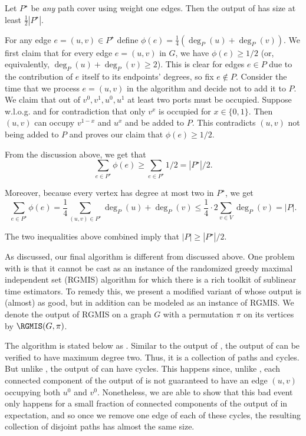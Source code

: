 \begin{claim}\label{clm: alg-one-approx}
    Let $P^\star$ be {\em any} path cover using weight one edges. Then the output of \algone{} has size at least $\frac{1}{2}|P^\star|$.
\end{claim}
\begin{myproof}
    For any edge $e=(u, v) \in P^\star$ define $\phi(e) = \frac{1}{4}(\deg_P(u) + \deg_P(v))$. We first claim that for every edge $e=(u, v)$ in $G$, we have $\phi(e) \geq 1/2$ (or, equivalently, $\deg_P(u)+\deg_P(v) \geq 2$). This is clear for edges $e \in P$ due to the contribution of $e$ itself to its endpoints' degrees, so fix $e \not\in P$. Consider the time that we process $e=(u, v)$ in the algorithm and decide not to add it to $P$. We claim that out of $v^0, v^1, u^0, u^1$ at least two ports must be occupied. Suppose w.l.o.g. and for contradiction that only $v^x$ is occupied for $x \in \{0, 1\}$. Then $(u, v)$ can occupy $v^{1-x}$ and $u^x$ and be added to $P$. This contradicts $(u, v)$ not being added to $P$ and proves our claim that $\phi(e) \geq 1/2$. 
    
    From the discussion above, we get that
    $$
        \sum_{e \in P^\star} \phi(e) \geq \sum_{e \in P^\star} 1/2 = |P^\star|/2.
    $$
    
    Moreover, because every vertex has degree at most two in $P^\star$, we get 
    $$
    \sum_{e \in P^\star} \phi(e) = \frac{1}{4} \sum_{(u, v) \in P^\star} \deg_P(u)+\deg_P(v) \leq \frac{1}{4} \cdot 2 \sum_{v \in V} \deg_P(v) = |P|.
    $$
    
    The two inequalities above combined imply that $|P| \geq |P^\star|/2$.
\end{myproof}

As discussed, our final algorithm is different from \algone{} discussed above. One problem with \algone{} is that it cannot be cast as an instance of the randomized greedy maximal independent set (RGMIS) algorithm for which there is a rich toolkit of sublinear time estimators. To remedy this, we present a modified variant of \algone{} whose output is (almost) as good, but in addition can be modeled as an instance of RGMIS. We denote the output of RGMIS on a graph $G$ with a permutation $\pi$ on its vertices by $\RGMIS(G, \pi)$.

The algorithm is stated below as \algtwo{}. Similar to the output of \algone{}, the output of \algtwo{} can be verified to have maximum degree two. Thus, it is a collection of paths and cycles. But unlike \algone{}, the output of \algtwo{} can have cycles. This happens since, unlike \algone{}, each connected component of the output of \algtwo{} is not guaranteed to have an edge $(u, v)$ occupying both $u^0$ and $v^0$. Nonetheless, we are able to show that this bad event only happens for a small fraction of connected components of the output of \algtwo{} in expectation, and so once we remove one edge of each of these cycles, the resulting collection of disjoint paths has almost the same size.

